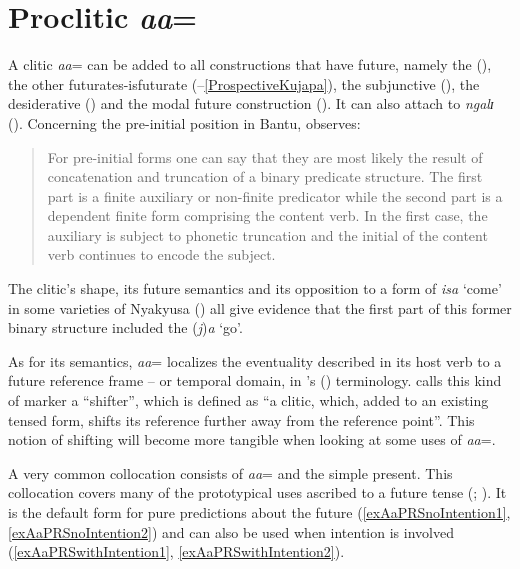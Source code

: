 \section{Proclitic \textit{aa}=}\label{ProcliticAa}
A clitic \textit{aa}= can be added to all constructions that have future, namely the  (), the other futurates-is{futurate} (--\ref{ProspectiveKujapa}), the subjunctive (), the desiderative () and the modal future construction (). It can also attach to  \textit{ngalɪ} (). Concerning the pre-initial position in Bantu, \citeauthor{GueldemannT2003} observes:
\begin{quote}
For pre-initial forms one can say that they are most likely the result of concatenation and truncation of a binary predicate structure. The first part is a finite auxiliary or non-finite predicator while the second part is a dependent finite form comprising the content verb. In the first case, the auxiliary is subject to phonetic truncation and the initial of the content verb continues to encode the subject.  \citep[186]{GueldemannT2003}
\end{quote}
The clitic's shape, its future semantics and its opposition to a  form of \textit{isa} `come' in some varieties of Nyakyusa () all give evidence that the first part of this former binary structure included the  (\textit{j})\textit{a} `go'.

As for its semantics, \textit{aa}= localizes the eventuality described in its host verb to a future reference frame -- or temporal domain, in \citeauthor{BotneRKershnerT2008}'s (\citeyear{BotneRKershnerT2008}) terminology. \citet[316]{NurseD2008} calls this kind of marker a ``shifter'', which is defined as ``a clitic, which, added to an existing tensed form, shifts its reference further away from the reference point''. This notion of shifting will become more tangible when looking at some uses of \textit{aa}=.

A very common collocation consists of \textit{aa}= and the simple present. This collocation covers many of the prototypical uses ascribed to a future tense (\citealt{DahlOe1985}; \citeyear{DahlOe2000b}). It is the default form for pure predictions about the future (\ref{exAaPRSnoIntention1}, \ref{exAaPRSnoIntention2}) and can also be used when intention is involved (\ref{exAaPRSwithIntention1}, \ref{exAaPRSwithIntention2}).
 
